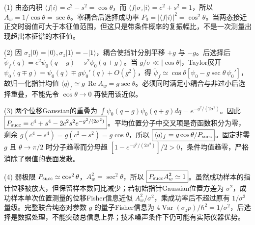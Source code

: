 (1) 由态内积 \(\langle f|i\rangle=c^2-s^2=\cos\theta\)，而 \(\langle f|\sigma_z|i\rangle=c^2+s^2=1\)，所以 \(\boxed{A_w=1/\cos\theta=\sec\theta}\)。零耦合后选择成功率 \(P_0=|\langle f|i\rangle|^2=\cos^2\theta\)。当两态接近正交时弱值可大于本征值范围，但这只是带条件概率的复振幅比，不是一次测量出现超出本征谱的本征值。

(2) 因 \(\sigma_z|0\rangle=|0\rangle,\sigma_z|1\rangle=-|1\rangle\)，耦合使指针分别平移 \(+g\) 与 \(-g\)。后选择后 \(\tilde\psi_f(q)=c^2\psi_0(q-g)-s^2\psi_0(q+g)\)。当 \(g/\sigma\ll|\cos\theta|\)，Taylor展开 \(\psi_0(q\mp g)=\psi_0(q)\mp g\psi_0'(q)+O(g^2)\)，得 \(\tilde\psi_f\simeq\cos\theta[\psi_0-g\sec\theta\,\psi_0']\)，故归一化指针均值 \(\boxed{\langle q\rangle_f\simeq g\,\operatorname{Re}A_w=g\sec\theta}\)。必须同时满足小耦合与非过小后选择重叠，不能先令 \(\cos\theta\to0\) 再使用该近似。

(3) 两个位移Gaussian的重叠为 \(\int\psi_0(q-g)\psi_0(q+g)dq=e^{-g^2/(2\sigma^2)}\)。因此 \(\boxed{P_{\rm succ}=c^4+s^4-2c^2s^2e^{-g^2/(2\sigma^2)}}\)。平均位置分子中交叉项是奇函数积分为零，剩余 \(g(c^4-s^4)=g(c^2-s^2)=g\cos\theta\)，所以 \(\boxed{\langle q\rangle_f=g\cos\theta/P_{\rm succ}}\)。固定非零 \(g\) 且 \(\theta\to\pi/2\) 时分子趋零而分母趋 \([1-e^{-g^2/(2\sigma^2)}]/2>0\)，条件均值趋零，严格消除了弱值的表面发散。

(4) 弱极限 \(P_{\rm succ}\simeq\cos^2\theta\)，\(A_w^2=\sec^2\theta\)，所以 \(\boxed{P_{\rm succ}A_w^2\simeq1}\)。虽然成功样本的指针位移被放大，但保留样本数同比减少；若初始指针Gaussian位置方差为 \(\sigma^2\)，成功样本单次位置测量的位移Fisher信息近似 \(A_w^2/\sigma^2\)，乘成功率后不超过原有 \(1/\sigma^2\) 量级。完整联合纯态对参数 \(g\) 的量子Fisher信息为 \(4\operatorname{Var}(\sigma_zp)/\hbar^2=1/\sigma^2\)，后选择是数据处理，不能突破总信息上界；技术噪声条件下仍可能有实际仪器优势。
